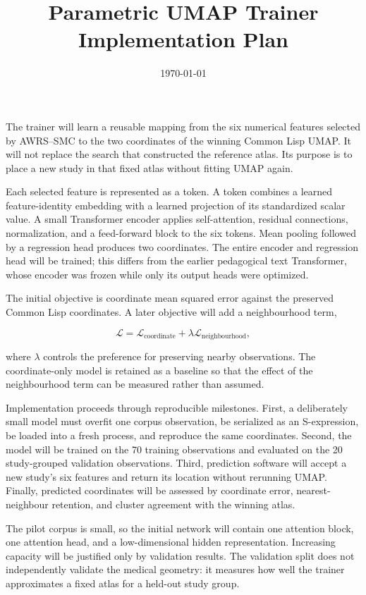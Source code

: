\documentclass[12pt]{article}
\title{Parametric UMAP Trainer Implementation Plan}
\author{}
\date{\today}
\begin{document}
\maketitle

The trainer will learn a reusable mapping from the six numerical features selected
by AWRS--SMC to the two coordinates of the winning Common Lisp UMAP.  It will not
replace the search that constructed the reference atlas.  Its purpose is to place
a new study in that fixed atlas without fitting UMAP again.

Each selected feature is represented as a token.  A token combines a learned
feature-identity embedding with a learned projection of its standardized scalar
value.  A small Transformer encoder applies self-attention, residual connections,
normalization, and a feed-forward block to the six tokens.  Mean pooling followed
by a regression head produces two coordinates.  The entire encoder and regression
head will be trained; this differs from the earlier pedagogical text Transformer,
whose encoder was frozen while only its output heads were optimized.

The initial objective is coordinate mean squared error against the preserved
Common Lisp coordinates.  A later objective will add a neighbourhood term,

\[
  \mathcal{L}=\mathcal{L}_{\mathrm{coordinate}}
  +\lambda\mathcal{L}_{\mathrm{neighbourhood}},
\]

where $\lambda$ controls the preference for preserving nearby observations.  The
coordinate-only model is retained as a baseline so that the effect of the
neighbourhood term can be measured rather than assumed.

Implementation proceeds through reproducible milestones.  First, a deliberately
small model must overfit one corpus observation, be serialized as an S-expression,
be loaded into a fresh process, and reproduce the same coordinates.  Second, the
model will be trained on the 70 training observations and evaluated on the 20
study-grouped validation observations.  Third, prediction software will accept a
new study's six features and return its location without rerunning UMAP.  Finally,
predicted coordinates will be assessed by coordinate error, nearest-neighbour
retention, and cluster agreement with the winning atlas.

The pilot corpus is small, so the initial network will contain one attention block,
one attention head, and a low-dimensional hidden representation.  Increasing
capacity will be justified only by validation results.  The validation split does
not independently validate the medical geometry: it measures how well the trainer
approximates a fixed atlas for a held-out study group.
\end{document}
